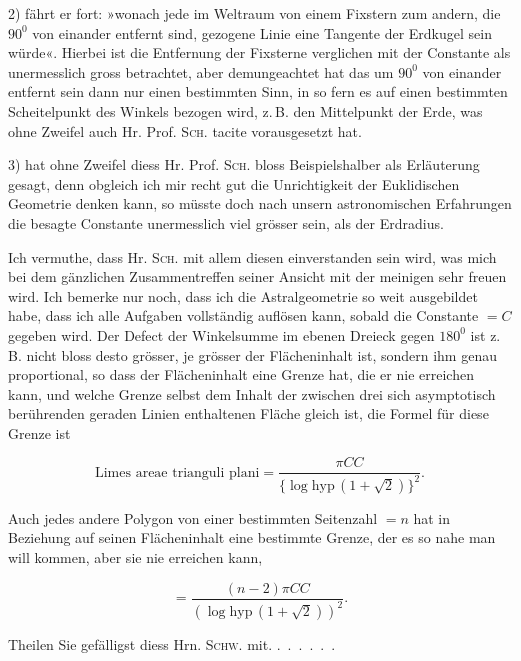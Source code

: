 2) fährt er fort: »wonach jede im Weltraum von einem Fixstern zum andern, die $90^{0}$ von einander entfernt sind, gezogene Linie eine Tangente der Erdkugel sein würde«. Hierbei ist die Entfernung der Fixsterne verglichen mit der Constante als unermesslich gross betrachtet, aber demungeachtet hat das um $90^{0}$ von einander entfernt sein dann nur einen bestimmten Sinn, in so fern es auf einen bestimmten Scheitelpunkt des Winkels bezogen wird, z.\,B. den Mittelpunkt der Erde, was ohne Zweifel auch Hr. Prof. \textsc{Sch.} tacite vorausgesetzt hat.

3) hat ohne Zweifel diess Hr. Prof. \textsc{Sch.} bloss Beispielshalber als Erläuterung gesagt, denn obgleich ich mir recht gut die Unrichtigkeit der Euklidischen Geometrie denken kann, so müsste doch nach unsern astronomischen Erfahrungen die besagte Constante unermesslich viel grösser sein, als der Erdradius.

Ich vermuthe, dass Hr. \textsc{Sch.} mit allem diesen einverstanden sein wird, was mich bei dem gänzlichen Zusammentreffen seiner Ansicht mit der meinigen sehr freuen wird. Ich bemerke nur noch, dass ich die Astralgeometrie so weit ausgebildet habe, dass ich alle Aufgaben vollständig auflösen kann, sobald die Constante $= C$ gegeben wird. Der Defect der Winkelsumme im ebenen Dreieck gegen $180^{0}$ ist z.\,B. nicht bloss desto grösser, je grösser der Flächeninhalt ist, sondern ihm genau proportional, so dass der Flächeninhalt eine Grenze hat, die er nie erreichen kann, und welche Grenze selbst dem Inhalt der zwischen drei sich asymptotisch berührenden geraden Linien enthaltenen Fläche gleich ist, die Formel für diese Grenze ist
\begin{center}\end{center}
\[
\text{Limes areae trianguli plani} = \frac{\pi CC}{\{\log\mathrm{hyp}\,(1+\sqrt{2})\}^{2}}.
\]



Auch jedes andere Polygon von einer bestimmten Seitenzahl $= n$ hat in Beziehung auf seinen Flächeninhalt eine bestimmte Grenze, der es so nahe man will kommen, aber sie nie erreichen kann,

\[
= \frac{(n-2)\pi CC}{(\log\mathrm{hyp}\,(1+\sqrt{2}))^{2}}.
\]

Theilen Sie gefälligst diess Hrn. \textsc{Schw.} mit. .\ .\ .\ .\ .\ .

\bigskip
\noindent\hrulefill


